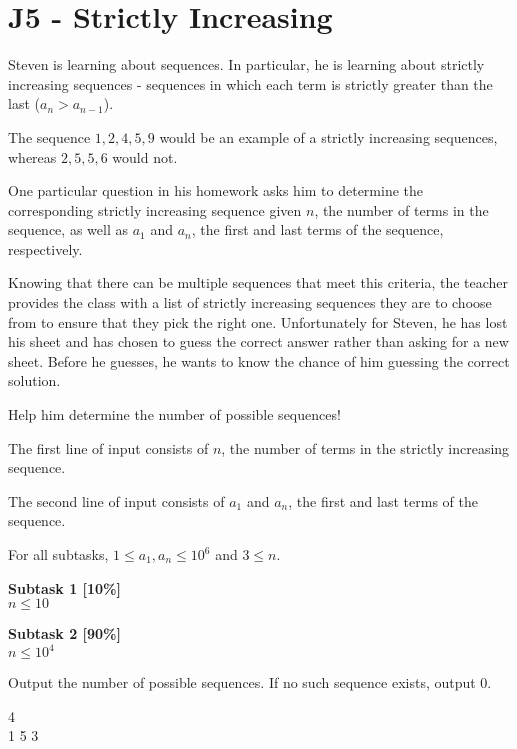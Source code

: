 \section*{J5 - Strictly Increasing}
Steven is learning about sequences. In particular, he is learning about strictly increasing sequences - sequences in which each term is strictly greater than the last ($a_{n} > a_{n - 1}$).

The sequence $1,2,4,5,9$ would be an example of a strictly increasing sequences, whereas $2,5,5,6$ would not.

One particular question in his homework asks him to determine the corresponding strictly increasing sequence given $n$, the number of terms in the sequence, as well as $a_1$ and $a_n$, the first and last terms of the sequence, respectively.

Knowing that there can be multiple sequences that meet this criteria, the teacher provides the class with a list of strictly increasing sequences they are to choose from to ensure that they pick the right one. Unfortunately for Steven, he has lost his sheet and has chosen to guess the correct answer rather than asking for a new sheet. Before he guesses, he wants to know the chance of him guessing the correct solution.

Help him determine the number of possible sequences!

The first line of input consists of $n$, the number of terms in the strictly increasing sequence.

The second line of input consists of $a_1$ and $a_n$, the first and last terms of the sequence.

\constraints
For all subtasks, $1 \leq a_1, a_n \leq 10^6$ and $3 \leq n$.

\textbf{Subtask 1 [10\%]} \\
$n \leq 10$ 

\textbf{Subtask 2 [90\%]} \\
$n \leq 10^4$

\outputformat
Output the number of possible sequences. If no such sequence exists, output $0$.

\addsample
{
    4 \\
    1 5
}
{
    3
}